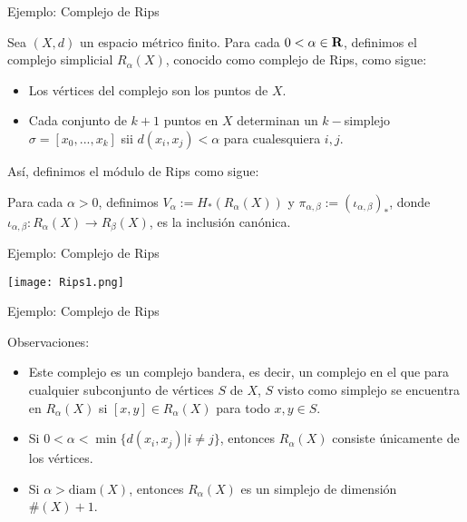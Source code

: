 \documentclass{beamer}
\def\R\re
\def \R{{\bf R}}
\def \re{{\mathbb R}}
\begin{document}
\begin{frame}{Ejemplo: Complejo de Rips}
    
    Sea $(X,d)$ un espacio métrico finito. 
    Para cada $0<\alpha\in\R$, definimos el complejo simplicial $R_\alpha(X)$, conocido como complejo de Rips, como sigue:
\pause
    \begin{itemize}
        \item Los vértices del complejo son los puntos de $X$.

        \item Cada conjunto de $k+1$ puntos en $X$ determinan un $k-$simplejo $\sigma=[x_0, ..., x_k]$ sii $d(x_i, x_j)<\alpha$ para cualesquiera $i,j$.
        
    \end{itemize}
\pause

    Así, definimos el módulo de Rips como sigue: 
    
    Para cada $\alpha>0$, definimos $V_\alpha := H_*(R_\alpha(X))$ y $\pi_{\alpha,\beta}:=(\iota_{\alpha,\beta})_*$, donde $\iota_{\alpha, \beta}:R_{\alpha}(X)\rightarrow R_\beta(X)$, es la inclusión canónica. 
    
\end{frame}
    
\begin{frame}{Ejemplo: Complejo de Rips}

    \centerline{
    \texttt{[image: Rips1.png]}}
    
\end{frame}

\begin{frame}{Ejemplo: Complejo de Rips}
    
    \begin{block}{Observaciones:}
        \begin{itemize}
        \item Este complejo es un complejo bandera, es decir, un complejo en el que para cualquier subconjunto de vértices $S$ de $X$, $S$ visto como simplejo se encuentra en $R_\alpha(X)$ si $[x,y]\in R_\alpha(X)$ para todo $x,y\in S$.
        \pause
        \item Si $0<\alpha< \min\{d(x_i,x_j)| i\neq j\}$, entonces $R_\alpha(X)$ consiste únicamente de los vértices. 
        \pause
        \item Si $\alpha> \text{diam}(X)$, entonces $R_\alpha(X)$ es un simplejo de dimensión $\#(X)+1$.
        
        \end{itemize}
    \end{block}
    
\end{frame}
\end{document}
